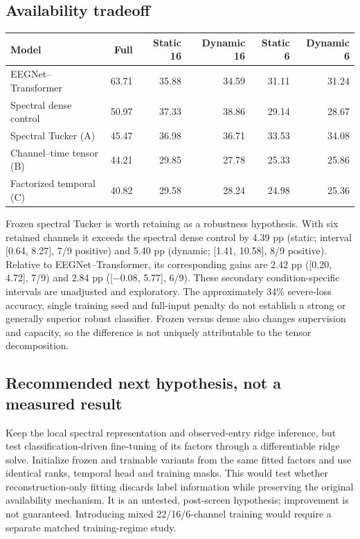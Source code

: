 \subsection*{Availability tradeoff}
\begin{center}
\begin{tabular}{@{}lrrrrr@{}}\toprule
Model & Full & Static 16 & Dynamic 16 & Static 6 & Dynamic 6 \\ \midrule
EEGNet--Transformer & 63.71 & 35.88 & 34.59 & 31.11 & 31.24 \\
Spectral dense control & 50.97 & 37.33 & 38.86 & 29.14 & 28.67 \\
Spectral Tucker (A) & 45.47 & 36.98 & 36.71 & 33.53 & 34.08 \\
Channel--time tensor (B) & 44.21 & 29.85 & 27.78 & 25.33 & 25.86 \\
Factorized temporal (C) & 40.82 & 29.58 & 28.24 & 24.98 & 25.36 \\
\bottomrule\end{tabular}\end{center}
Frozen spectral Tucker is worth retaining as a robustness hypothesis. With
six retained channels it exceeds the spectral dense control by 4.39 pp
(static; interval [0.64, 8.27], 7/9 positive) and 5.40 pp (dynamic;
[1.41, 10.58], 8/9 positive). Relative to EEGNet--Transformer, its corresponding
gains are 2.42 pp ([0.20, 4.72], 7/9) and 2.84 pp ([$-0.08$, 5.77], 6/9).
These secondary condition-specific intervals are unadjusted and exploratory.
The approximately 34\% severe-loss accuracy, single training seed and full-input
penalty do not establish a strong or generally superior robust classifier.
Frozen versus dense also changes supervision and capacity, so the difference
is not uniquely attributable to the tensor decomposition.
\newpage
\subsection*{Recommended next hypothesis, not a measured result}
Keep the local spectral representation and observed-entry ridge inference,
but test classification-driven fine-tuning of its factors through a
differentiable ridge solve. Initialize frozen and trainable variants from the
same fitted factors and use identical ranks, temporal head and training masks.
This would test whether reconstruction-only fitting discards label information
while preserving the original availability mechanism. It is an untested,
post-screen hypothesis; improvement is not guaranteed. Introducing mixed
22/16/6-channel training would require a separate matched training-regime study.

